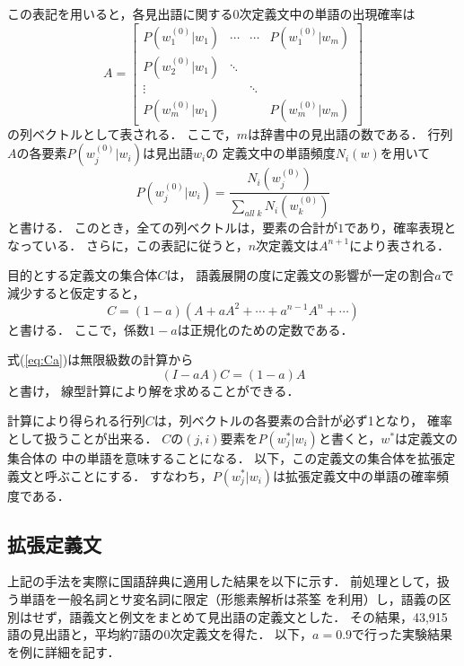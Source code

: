 \documentclass[japanese]{jnlp_1.4}
\begin{document}
この表記を用いると，各見出語に関する0次定義文中の単語の出現確率は
\begin{equation}
A=
\begin{bmatrix}
 {P\left( {w_1^{(0)}|w_1} \right)} & \cdots &\cdots &{P\left( {w_1^{(0)}|w_m} \right)} \\
 {P\left( {w_2^{(0)}|w_1} \right)}&\ddots &{}&{} \\
 \vdots &{}&\ddots &{} \\
 {P\left( {w_m^{(0)}|w_1} \right)}&{}&{}&{P\left( {w_m^{(0)}|w_m} \right)}
\end{bmatrix}
\label{eq:matrix}
\end{equation}
の列ベクトルとして表される．
ここで，$m$は辞書中の見出語の数である．
行列$A$の各要素$P(w_j^{(0)}|w_i)$は見出語$w_i$の
定義文中の単語頻度$N_i(w)$を用いて
\begin{equation}
 P(w_j^{(0)}|w_i)=\frac{N_i(w_j^{(0)})}{\sum_{all\;k}N_i(w_k^{(0)})}
\label{eq:frequency}
\end{equation}
と書ける．
このとき，全ての列ベクトルは，要素の合計が$1$であり，確率表現となっている．
さらに，この表記に従うと，$n$次定義文は$A^{n+1}$により表される．

目的とする定義文の集合体$C$は，
語義展開の度に定義文の影響が一定の割合$a$で減少すると仮定すると，
\pagebreak
\begin{equation}
  C=(1-a)(A+aA^2+\cdots+a^{n-1}A^n+\cdots)
\label{eq:Ca}
\end{equation}
と書ける．
ここで，係数$1-a$は正規化のための定数である．

式(\ref{eq:Ca})は無限級数の計算から
\begin{equation}
 (I-aA)C=(1-a)A
\label{eq:target}
\end{equation}
と書け，
線型計算により解を求めることができる．

計算により得られる行列$C$は，列ベクトルの各要素の合計が必ず1となり，
確率として扱うことが出来る．
$C$の$(j,i)$要素を$P(w_j^*|w_i)$と書くと，$w^*$は定義文の集合体の
中の単語を意味することになる．
以下，この定義文の集合体を拡張定義文と呼ぶことにする．
すなわち，$P(w_j^*|w_i)$は拡張定義文中の単語の確率頻度である．



\subsection{拡張定義文}
\label{subsec:expand}

上記の手法を実際に国語辞典\cite{gakkenj}に適用した結果を以下に示す．
前処理として，扱う単語を一般名詞とサ変名詞に限定（形態素解析は茶筌
\cite{chasenj}を利用）し，語義の区別はせず，語義文と例文をまとめて見出語の定義文とした．
その結果，43,915語の見出語と，平均約7語の0次定義文を得た．
以下，$a=0.9$で行った実験結果を例に詳細を記す．
\end{document}
